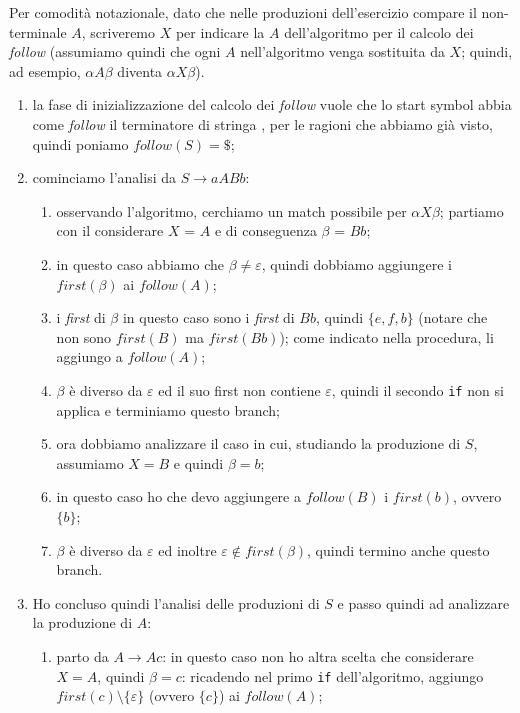 \documentclass[class=book, crop=false, oneside, 12pt]{standalone}
\begin{document}
Per comodità notazionale, dato che nelle produzioni dell'esercizio compare il non-terminale \(A\), scriveremo \(X\) per indicare la \(A\) dell'algoritmo per il calcolo dei \emph{follow} (assumiamo quindi che ogni \(A\) nell'algoritmo venga sostituita da \(X\); quindi, ad esempio, \(\alpha A \beta\) diventa \(\alpha X \beta\)).
\begin{enumerate}
    \item la fase di inizializzazione del calcolo dei \emph{follow} vuole che lo start symbol abbia come \emph{follow} il terminatore di stringa , per le ragioni che abbiamo già visto, quindi poniamo \(follow(S) = \$\);
    \item cominciamo l'analisi da \(S \to aABb\):
    \begin{enumerate}
        \item osservando l'algoritmo, cerchiamo un match possibile per \(\alpha X \beta\); partiamo con il considerare \(X\) = \(A\) e di conseguenza \(\beta\) = \(Bb\);
        \item in questo caso abbiamo che \(\beta \neq \varepsilon\), quindi dobbiamo aggiungere i \(first(\beta)\) ai \(follow(A)\);
        \item i \emph{first} di \(\beta\) in questo caso sono i \emph{first} di \(Bb\), quindi \(\{e, f, b\}\) (notare che non sono \(first(B)\) ma \(first(Bb)\)); come indicato nella procedura, li aggiungo a \(follow(A)\);
        \item \(\beta\) è diverso da \(\varepsilon\) ed il suo first non contiene \(\varepsilon\), quindi il secondo \texttt{if} non si applica e terminiamo questo branch;
        \item ora dobbiamo analizzare il caso in cui, studiando la produzione di \(S\), assumiamo \(X = B\) e quindi \(\beta = b\);
        \item in questo caso ho che devo aggiungere a \(follow(B)\) i \(first(b)\), ovvero \(\{b\}\);
        \item \(\beta\) è diverso da \(\varepsilon\) ed inoltre \(\varepsilon \notin first(\beta)\), quindi termino anche questo branch.
    \end{enumerate}
    \item Ho concluso quindi l’analisi delle produzioni di \(S\) e passo quindi ad analizzare la produzione di \(A\):
    \begin{enumerate}
        \item parto da \(A \to Ac\): in questo caso non ho altra scelta che considerare \(X = A\), quindi \(\beta = c\): ricadendo nel primo \texttt{if} dell'algoritmo, aggiungo \(first(c) \setminus \{\varepsilon\}\) (ovvero \(\{c\}\)) ai \(follow(A)\);

\end{enumerate}
\end{enumerate}
\end{document}
